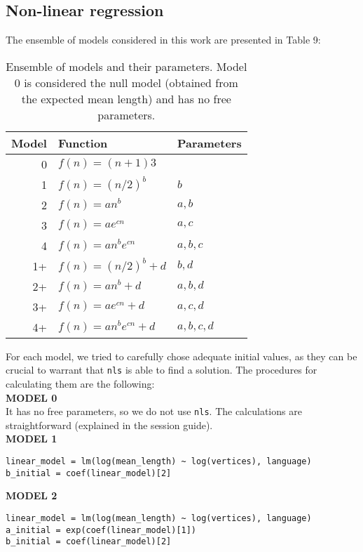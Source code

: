 \documentclass{article}
\begin{document}
\subsection{Non-linear regression}
The ensemble of models considered in this work are presented in Table 9:


\begin{table}[h!]
\centering
\begin{tabular}{rll}
    \hline
    Model & Function & Parameters \\
    \hline
    0   & $f(n) = (n+1)3$               & \\
    1   & $f(n) = (n/2)^b$              & $b$ \\
    2   & $f(n) = an^b$                 & $a,b$ \\
    3   & $f(n) = ae^{cn}$              & $a,c$ \\
    4   & $f(n) = an^be^{cn}$           & $a,b,c$ \\
    1+  & $f(n) = (n/2)^b + d$          & $b,d$ \\
    2+  & $f(n) = an^b +d $             & $a,b,d$ \\
    3+  & $f(n) = ae^{cn} + d$          & $a,c,d$ \\
    4+  & $f(n) = an^be^{cn} + d $      & $a,b,c,d$ \\
    \hline
\end{tabular}
\label{Table:T9}
\caption{Ensemble of models and their parameters. Model 0 is considered the null model (obtained from the expected mean length) and has no free parameters.}
\end{table}

For each model, we tried to carefully chose adequate initial values, as they can be crucial to warrant that \texttt{nls} is able to find a solution. The procedures for calculating them are the following: \\

\noindent \textbf{MODEL 0} \\
It has no free parameters, so we do not use \texttt{nls}. The calculations are straightforward (explained in the session guide). \\

\noindent \textbf{MODEL 1}
\begin{lstlisting}
linear_model = lm(log(mean_length) ~ log(vertices), language)
b_initial = coef(linear_model)[2]
\end{lstlisting}

\noindent \textbf{MODEL 2}
\begin{lstlisting}
linear_model = lm(log(mean_length) ~ log(vertices), language)
a_initial = exp(coef(linear_model)[1])
b_initial = coef(linear_model)[2]
\end{lstlisting}
\end{document}
